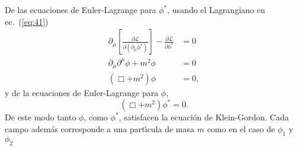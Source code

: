 De las ecuaciones de Euler-Lagrange para $\phi^*$, usando el Lagrangiano en ec.~(\ref{eq:41})
\begin{align}
  \partial_\mu\left[
      \frac{\partial\mathcal{L}}{\partial(\partial_\mu\phi^*)}\right]-\frac{\partial\mathcal{L}}{\partial\phi^*}&=0\nonumber\\
    \partial_\mu\partial^\mu\phi+m^2\phi&=0\nonumber\\
    \label{eq:43}
    (\Box+m^2)\phi&=0,
\end{align}
y de la ecuaciones de Euler-Lagrange para $\phi$,
\begin{equation}
  \label{eq:44}
    (\Box+m^2)\phi^*=0.
\end{equation}
De este modo tanto $\phi$, como $\phi^*$, satisfacen la ecuaci\'on de Klein-Gordon. Cada campo adem\'as corresponde a una part\'\i cula de masa $m$ como en el caso de $\phi_1$ y $\phi_2$


